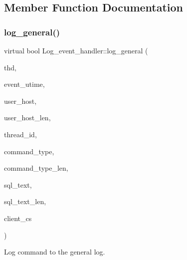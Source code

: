 \subsection{Member Function Documentation}
\mbox{\label{classLog__event__handler_aa9f98b8c0b48eb846877fe9d2496560e}} 
\subsubsection{\texorpdfstring{log\+\_\+general()}{log\_general()}}
{\footnotesize\ttfamily virtual bool Log\+\_\+event\+\_\+handler\+::log\+\_\+general (\begin{DoxyParamCaption}\item[{T\+HD $\ast$}]{thd,  }\item[{ulonglong}]{event\+\_\+utime,  }\item[{const char $\ast$}]{user\+\_\+host,  }\item[{size\+\_\+t}]{user\+\_\+host\+\_\+len,  }\item[{my\+\_\+thread\+\_\+id}]{thread\+\_\+id,  }\item[{const char $\ast$}]{command\+\_\+type,  }\item[{size\+\_\+t}]{command\+\_\+type\+\_\+len,  }\item[{const char $\ast$}]{sql\+\_\+text,  }\item[{size\+\_\+t}]{sql\+\_\+text\+\_\+len,  }\item[{const C\+H\+A\+R\+S\+E\+T\+\_\+\+I\+N\+FO $\ast$}]{client\+\_\+cs }\end{DoxyParamCaption})\hspace{0.3cm}{\ttfamily [pure virtual]}}

Log command to the general log.


